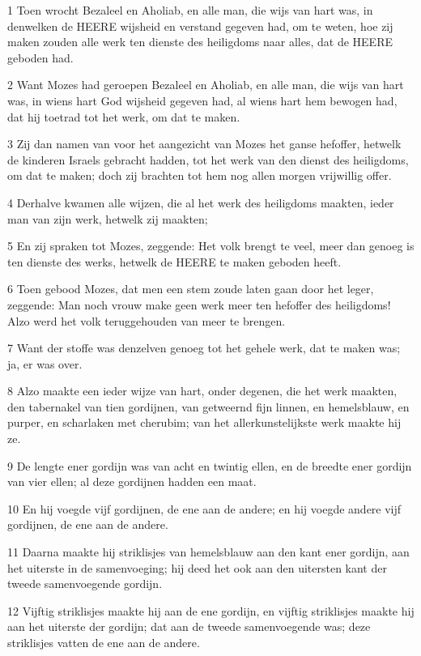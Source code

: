 \par 1 Toen wrocht Bezaleel en Aholiab, en alle man, die wijs van hart was, in denwelken de HEERE wijsheid en verstand gegeven had, om te weten, hoe zij maken zouden alle werk ten dienste des heiligdoms naar alles, dat de HEERE geboden had.
\par 2 Want Mozes had geroepen Bezaleel en Aholiab, en alle man, die wijs van hart was, in wiens hart God wijsheid gegeven had, al wiens hart hem bewogen had, dat hij toetrad tot het werk, om dat te maken.
\par 3 Zij dan namen van voor het aangezicht van Mozes het ganse hefoffer, hetwelk de kinderen Israels gebracht hadden, tot het werk van den dienst des heiligdoms, om dat te maken; doch zij brachten tot hem nog allen morgen vrijwillig offer.
\par 4 Derhalve kwamen alle wijzen, die al het werk des heiligdoms maakten, ieder man van zijn werk, hetwelk zij maakten;
\par 5 En zij spraken tot Mozes, zeggende: Het volk brengt te veel, meer dan genoeg is ten dienste des werks, hetwelk de HEERE te maken geboden heeft.
\par 6 Toen gebood Mozes, dat men een stem zoude laten gaan door het leger, zeggende: Man noch vrouw make geen werk meer ten hefoffer des heiligdoms! Alzo werd het volk teruggehouden van meer te brengen.
\par 7 Want der stoffe was denzelven genoeg tot het gehele werk, dat te maken was; ja, er was over.
\par 8 Alzo maakte een ieder wijze van hart, onder degenen, die het werk maakten, den tabernakel van tien gordijnen, van getweernd fijn linnen, en hemelsblauw, en purper, en scharlaken met cherubim; van het allerkunstelijkste werk maakte hij ze.
\par 9 De lengte ener gordijn was van acht en twintig ellen, en de breedte ener gordijn van vier ellen; al deze gordijnen hadden een maat.
\par 10 En hij voegde vijf gordijnen, de ene aan de andere; en hij voegde andere vijf gordijnen, de ene aan de andere.
\par 11 Daarna maakte hij striklisjes van hemelsblauw aan den kant ener gordijn, aan het uiterste in de samenvoeging; hij deed het ook aan den uitersten kant der tweede samenvoegende gordijn.
\par 12 Vijftig striklisjes maakte hij aan de ene gordijn, en vijftig striklisjes maakte hij aan het uiterste der gordijn; dat aan de tweede samenvoegende was; deze striklisjes vatten de ene aan de andere.
